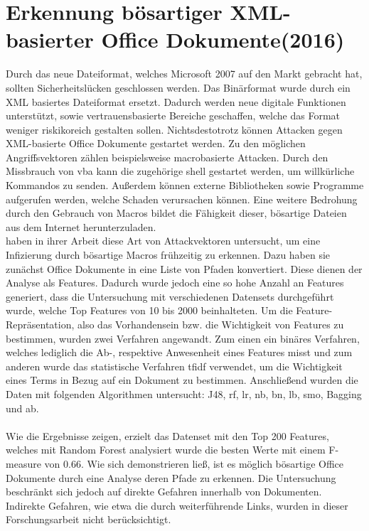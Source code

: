 \documentclass[
    12pt, %
    DIV10,
    ngerman, %
    a4paper, %
    oneside, %
    titlepage, %
    parskip=half, %
    headings=normal, %
    listof=totoc, %
    bibliography=totoc, %
    index=totoc, %
    captions=tableheading, %
    final %
]{scrreprt}
\begin{document}
\section{Erkennung bösartiger XML-basierter Office Dokumente(2016)}
Durch das neue Dateiformat, welches Microsoft 2007 auf den Markt gebracht hat, sollten Sicherheitslücken geschlossen werden.
Das Binärformat wurde durch ein	XML basiertes Dateiformat ersetzt. Dadurch werden neue digitale Funktionen unterstützt, sowie vertrauensbasierte Bereiche geschaffen, welche das Format weniger riskikoreich gestalten sollen. Nichtsdestotrotz können Attacken gegen XML-basierte Office Dokumente gestartet werden. Zu den möglichen Angriffsvektoren zählen beispielsweise macrobasierte Attacken. Durch den Missbrauch von \ac{vba} kann die zugehörige shell gestartet werden, um willkürliche Kommandos zu senden. Außerdem können externe Bibliotheken sowie Programme aufgerufen werden, welche Schaden verursachen können. Eine weitere Bedrohung durch den Gebrauch von Macros bildet die Fähigkeit dieser, bösartige Dateien aus dem Internet herunterzuladen.\\
\textcite{Cohen2016} haben in ihrer Arbeit diese Art von Attackvektoren untersucht, um eine Infizierung durch bösartige Macros frühzeitig zu erkennen. Dazu haben sie zunächst Office Dokumente in eine Liste von Pfaden konvertiert. Diese dienen der Analyse als Features. Dadurch wurde jedoch eine so hohe Anzahl an Features generiert, dass die Untersuchung mit verschiedenen Datensets durchgeführt wurde, welche Top Features von 10 bis 2000 beinhalteten. Um die Feature-Repräsentation, also das Vorhandensein bzw. die Wichtigkeit von Features zu bestimmen, wurden zwei Verfahren angewandt. Zum einen ein binäres Verfahren, welches lediglich die Ab-, respektive Anwesenheit eines Features misst und zum anderen wurde das statistische Verfahren \ac{tfidf} verwendet, um die Wichtigkeit eines Terms in Bezug auf ein Dokument zu bestimmen. Anschließend wurden die Daten mit folgenden Algorithmen untersucht: J48, \ac{rf}, \ac{lr}, \ac{nb}, \ac{bn}, \ac{lb}, \ac{smo}, Bagging und \ac{ab}. \\\\
Wie die Ergebnisse zeigen, erzielt das Datenset mit den Top 200 Features, welches mit Random Forest analysiert wurde die besten Werte mit einem F-measure von 0.66.
Wie sich demonstrieren ließ, ist es möglich bösartige Office Dokumente durch eine Analyse deren Pfade zu erkennen. 
Die Untersuchung beschränkt sich jedoch auf direkte Gefahren innerhalb von Dokumenten. Indirekte Gefahren, wie etwa die durch weiterführende Links, wurden in dieser Forschungsarbeit nicht berücksichtigt.
\end{document}
